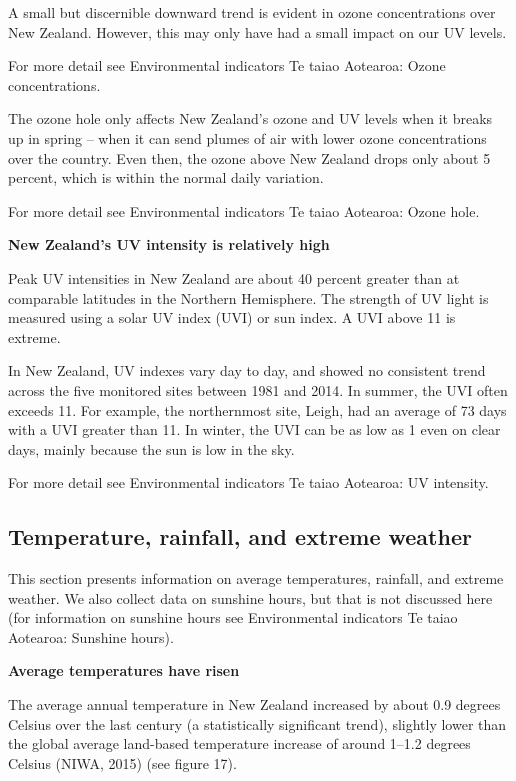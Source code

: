 \documentclass[11pt]{article} %
\begin{document}

A small but discernible downward trend is evident in ozone concentrations over New Zealand. However, this may only have had a small impact on our UV levels.

For more detail see Environmental indicators Te taiao Aotearoa: Ozone concentrations.

The ozone hole only affects New Zealand’s ozone and UV levels when it breaks up in spring – when it can send plumes of air with lower ozone concentrations over the country. Even then, the ozone above New Zealand drops only about 5 percent, which is within the normal daily variation.

For more detail see Environmental indicators Te taiao Aotearoa: Ozone hole.

\textbf{New Zealand’s UV intensity is relatively high}

Peak UV intensities in New Zealand are about 40 percent greater than at comparable latitudes in the Northern Hemisphere. The strength of UV light is measured using a solar UV index (UVI) or sun index. A UVI above 11 is extreme.

In New Zealand, UV indexes vary day to day, and showed no consistent trend across the five monitored sites between 1981 and 2014. In summer, the UVI often exceeds 11. For example, the northernmost site, Leigh, had an average of 73 days with a UVI greater than 11. In winter, the UVI can be as low as 1 even on clear days, mainly because the sun is low in the sky.

For more detail see Environmental indicators Te taiao Aotearoa: UV intensity.

\subsection{Temperature, rainfall, and extreme weather}

This section presents information on average temperatures, rainfall, and extreme weather. We also collect data on sunshine hours, but that is not discussed here (for information on sunshine hours see Environmental indicators Te taiao Aotearoa: Sunshine hours).

\textbf{Average temperatures have risen}

The average annual temperature in New Zealand increased by about 0.9 degrees Celsius over the last century (a statistically significant trend), slightly lower than the global average land-based temperature increase of around 1–1.2 degrees Celsius (NIWA, 2015) (see figure 17).
\end{document}
